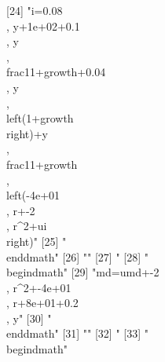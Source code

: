[24] "{i}=0.08\\, {y}+1e+02+0.1\\, {y}\\, \\frac{1}{1+{growth}}+0.04\\, {y}\\, \\left(1+{growth}\\right)+{y}\\, \\frac{1}{1+{growth}}\\, \\left(-4e+01\\, {r}+-2\\, {r}^{2}+{ui}\\right)"
[25] "\\end{dmath}"                                                                                                                                                                      
[26] ""                                                                                                                                                                                  
[27] "%
[28] "\\begin{dmath}"                                                                                                                                                                    
[29] "{md}={umd}+-2\\, {r}^{2}+-4e+01\\, {r}+8e+01+0.2\\, {y}"                                                                                                                           
[30] "\\end{dmath}"                                                                                                                                                                      
[31] ""                                                                                                                                                                                  
[32] "%
[33] "\\begin{dmath}"                                                                                                                                                                    
